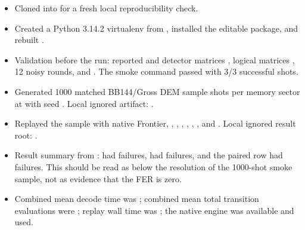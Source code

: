 \begin{itemize}
\item Cloned \texttt{} into \texttt{} for a fresh local reproducibility check.
\item Created a Python 3.14.2 virtualenv from \texttt{}, installed the editable package, and rebuilt \texttt{}.
\item Validation before the run: \texttt{} reported \texttt{} and \texttt{} detector matrices \texttt{}, logical matrices \texttt{}, 12 noisy rounds, and \texttt{}. The smoke command \texttt{} passed with 3/3 successful shots.
\item Generated 1000 matched BB144/Gross DEM sample shots per memory sector at \texttt{} with seed \texttt{}. Local ignored artifact: \texttt{}.
\item Replayed the sample with native Frontier, \texttt{}, \texttt{}, \texttt{}, \texttt{}, \texttt{}, \texttt{}, and \texttt{}. Local ignored result root: \texttt{}.
\item Result summary from \texttt{}: \texttt{} had \texttt{} failures, \texttt{} had \texttt{} failures, and the paired \texttt{} row had \texttt{} failures. This should be read as below the resolution of the 1000-shot smoke sample, not as evidence that the FER is zero.
\item Combined mean decode time was \texttt{}; combined mean total transition evaluations were \texttt{}; replay wall time was \texttt{}; the native engine was available and used.
\end{itemize}

